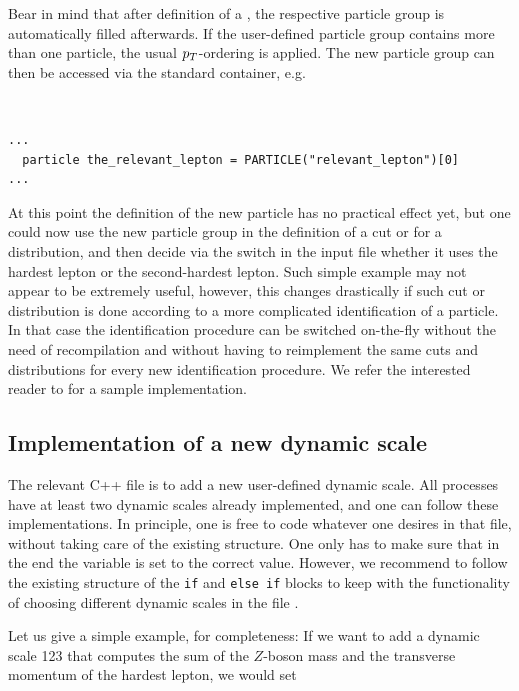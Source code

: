 \documentclass[english,11pt]{article}
\begin{document}
Bear in mind that after definition of a , the respective 
particle group is automatically filled afterwards. If the user-defined particle group contains more than one particle, the usual $p_T$-ordering is applied. The
new particle group can then be accessed via the standard 
 container, e.g.\

{\tt
\begin{lstlisting}     
... 
  particle the_relevant_lepton = PARTICLE("relevant_lepton")[0]
...
\end{lstlisting}
}

At this point the definition of the new particle has no practical effect yet, but one could now use the new particle group 
in the definition of a cut or for a distribution, and then decide via the switch in the input file whether it uses the hardest lepton 
or the second-hardest lepton. Such simple example may not appear to be extremely useful, however, this 
changes drastically if such cut or distribution is done according to a more complicated identification of a particle. In that 
case the identification procedure can be switched on-the-fly without the need of recompilation and without having to 
reimplement the same cuts and distributions for every new identification procedure. We refer the interested reader 
to \Matrixversion{} for a sample implementation.




\subsection{Implementation of a new dynamic scale}
The relevant C++ file is \Matrixversion{} to add a new user-defined dynamic scale.
All processes have at least two dynamic scales already implemented, and one can follow these implementations.
In principle, one is free to code whatever one desires
in that file, without taking care of the existing structure. One only has to make sure that 
in the end the variable  is set to the correct value. However, we recommend to follow the existing structure of the 
{\tt if} and {\tt else if} blocks to keep with the functionality of choosing different dynamic scales in the file .

Let us give a simple example, for completeness: If we want to add a dynamic scale 123 that computes the sum of the $Z$-boson mass 
and the transverse momentum of the hardest lepton, we would set
\end{document}
